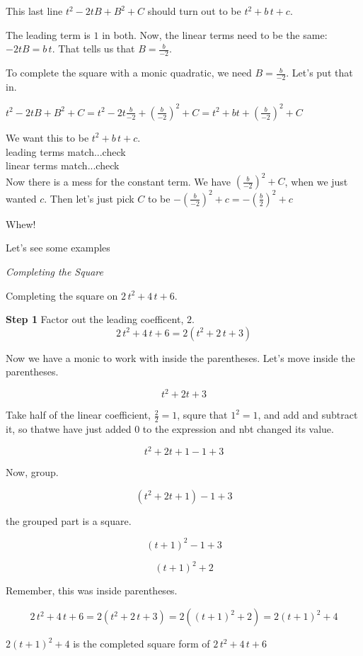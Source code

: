 \documentclass{ximera}
\begin{document}
This last line $t^2 - 2 t B + B^2 + C$ should turn out to be $t^2 + b \, t + c$.



The leading term is $1$ in both. Now, the linear terms need to be the same: $ - 2 t B = b \, t$.  That tells us that $B = \frac{b}{-2}$.


To complete the square with a monic quadratic, we need $B = \frac{b}{-2}$.  Let's put that in.


$t^2 - 2 t B + B^2 + C = t^2 - 2 t \frac{b}{-2} + \left(\frac{b}{-2}\right)^2 + C = t^2 + b t + \left(\frac{b}{-2}\right)^2 + C$


We want this to be $t^2 + b \, t + c$. \\

leading terms match...check \\
linear terms match...check \\

Now there is a mess for the constant term.  We have $\left(\frac{b}{-2}\right)^2 + C$, when we just wanted $c$.  Then let's just pick $C$ to be $-\left(\frac{b}{-2}\right)^2 + c = -\left(\frac{b}{2}\right)^2 + c$



Whew!

Let's see some examples








\begin{procedure} \textit{Completing the Square}



Completing the square on $2 \, t^2 + 4 \, t + 6$.


\textbf{Step 1} Factor out the leading coefficent, $2$. \\

\[     2 \, t^2 + 4 \, t + 6 = 2 (t^2 + 2 \, t + 3)   \] 


Now we have a monic to work with inside the parentheses. Let's move inside the parentheses.

\[ t^2 + 2 t + 3 \]

Take half of the linear coefficient, $\frac{2}{2} = 1$, squre that $1^2 = 1$, and add and subtract it, so thatwe have just added $0$ to the expression and nbt changed its value.


\[ t^2 + 2 t + 1 - 1 +3 \]


Now, group.

\[ (t^2 + 2 t + 1)- 1 +3 \]

the grouped part is a square.

\[ (t+1)^2- 1 +3 \]

\[ (t+1)^2 + 2 \]

Remember, this was inside parentheses.

\[     2 \, t^2 + 4 \, t + 6 = 2 (t^2 + 2 \, t + 3)  = 2 ((t+1)^2 + 2) =  2 (t+1)^2 + 4\] 


$2 (t+1)^2 + 4$ is the completed square form of $2 \, t^2 + 4 \, t + 6$


\end{procedure}
\end{document}
